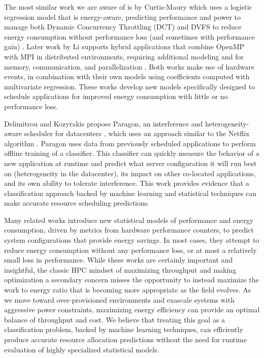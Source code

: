 The most similar work we are aware of is by Curtis-Maury \etal which uses a logistic regression model that is energy-aware, predicting performance and power to manage both Dynamic Concurrency Throttling (DCT) and DVFS to reduce energy consumption without performance loss (and sometimes with performance gain) \cite{Curtis-Maury2008}.
Later work by Li \etal supports hybrid applications that combine OpenMP with MPI in distributed environments, requiring additional modeling and for memory, communication, and parallelization \cite{LiIPDPS2010}.
Both works make use of hardware events, in combination with their own models using coefficients computed with multivariate regression.
These works develop new models specifically designed to schedule applications for improved energy consumption with little or no performance loss.

Delimitrou and Kozyrakis propose Paragon, an interference and heterogeneity-aware scheduler for datacenters \cite{Paragon}, which uses an approach similar to the Netflix algorithm \cite{NetflixPrize}.
Paragon uses data from previously scheduled applications to perform offline training of a classifier.
This classifier can quickly measure the behavior of a new application at runtime and predict what server configuration it will run best on (heterogeneity in the datacenter), its impact on other co-located applications, and its own ability to tolerate interference.
This work provides evidence that a classification approach backed by machine learning and statistical techniques can make accurate resource scheduling predictions.

Many related works introduce new statistical models of performance and energy consumption, driven by metrics from hardware performance counters, to predict system configurations that provide energy savings.
In most cases, they attempt to reduce energy consumption without any performance loss, or at most a relatively small loss in performance.
While these works are certainly important and insightful, the classic HPC mindset of maximizing throughput and making optimization a secondary concern misses the opportunity to instead maximize the work to energy ratio that is becoming more appropriate as the field evolves.
As we move toward over-provisioned environments and exascale systems with aggressive power constraints, maximizing energy efficiency can provide an optimal balance of throughput and cost.
We believe that treating this goal as a classification problem, backed by machine learning techniques, can efficiently produce accurate resource allocation predictions without the need for runtime evaluation of highly specialized statistical models. %


